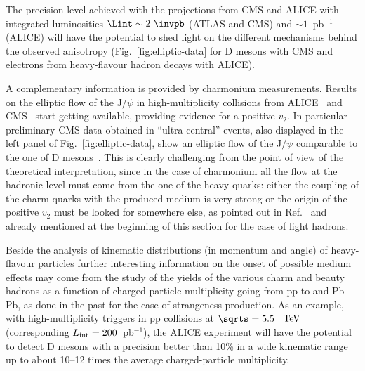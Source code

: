 The precision level achieved with the projections from CMS and ALICE with integrated luminosities $\Lint\sim 2~\invpb$  (ATLAS and CMS) and $\sim 1$~pb$^{-1}$ (ALICE) will have the potential to shed light on the different mechanisms behind the observed anisotropy (Fig.~\ref{fig:elliptic-data} for D mesons with CMS and electrons from heavy-flavour hadron decays with ALICE).

A complementary information is provided by charmonium measurements. Results on the elliptic flow of the J$/\psi$ in high-multiplicity \pPb collisions from ALICE~\cite{Acharya:2017tfn} and CMS~\cite{CMS:2018xac} start getting available, providing evidence for a positive $v_2$. In particular preliminary CMS data obtained in ``ultra-central'' events, also displayed in the left panel of Fig.~\ref{fig:elliptic-data},  show an elliptic flow of the J$/\psi$ comparable to the one of D mesons~\cite{CMS:2018xac}. This is clearly challenging from the point of view of the theoretical interpretation, since in the case of charmonium all the flow at the hadronic level must come from the one of the heavy quarks: either the coupling of the charm quarks with the produced medium is very strong or the origin of the positive $v_2$ must be looked for somewhere else, as pointed out in Ref.~\cite{Du:2018wsj} and already mentioned at the beginning of this section for the case of light hadrons.

Beside the analysis of kinematic distributions (in momentum and angle) of heavy-flavour particles further interesting information on the onset of possible medium effects may come from the study of the yields of the various charm and beauty hadrons as a function of charged-particle multiplicity going from pp to \pPb and Pb--Pb, as done in the past for the case of strangeness production. As an example, with high-multiplicity triggers in pp collisions at $\sqrts =5.5$~$~\text{TeV}$ (corresponding $L_{\rm int}=200$~pb$^{-1}$), the ALICE experiment will have the potential to detect D mesons with a precision better than 10\% in a wide kinematic range up to about 10--12 times the average charged-particle multiplicity. 






